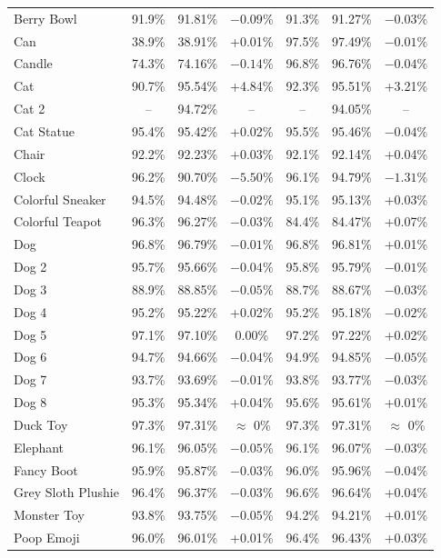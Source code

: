 \documentclass[journal,12pt,onecolumn,draftclsnofoot]{IEEEtran}
\begin{document}
\begin{longtable}{l c c c c c c}
Berry Bowl & 91.9\% & 91.81\% & $-0.09\%$ & 91.3\% & 91.27\% & $-0.03\%$ \\
Can & 38.9\% & 38.91\% & +0.01\% & 97.5\% & 97.49\% & $-0.01\%$ \\
Candle & 74.3\% & 74.16\% & $-0.14\%$ & 96.8\% & 96.76\% & $-0.04\%$ \\
Cat & 90.7\% & 95.54\% & +4.84\% & 92.3\% & 95.51\% & +3.21\% \\
Cat 2 & -- & 94.72\% & -- & -- & 94.05\% & -- \\
Cat Statue & 95.4\% & 95.42\% & +0.02\% & 95.5\% & 95.46\% & $-0.04\%$ \\
Chair & 92.2\% & 92.23\% & +0.03\% & 92.1\% & 92.14\% & +0.04\% \\
Clock & 96.2\% & 90.70\% & $-5.50\%$ & 96.1\% & 94.79\% & $-1.31\%$ \\
Colorful Sneaker & 94.5\% & 94.48\% & $-0.02\%$ & 95.1\% & 95.13\% & +0.03\% \\
Colorful Teapot & 96.3\% & 96.27\% & $-0.03\%$ & 84.4\% & 84.47\% & +0.07\% \\
Dog & 96.8\% & 96.79\% & $-0.01\%$ & 96.8\% & 96.81\% & +0.01\% \\
Dog 2 & 95.7\% & 95.66\% & $-0.04\%$ & 95.8\% & 95.79\% & $-0.01\%$ \\
Dog 3 & 88.9\% & 88.85\% & $-0.05\%$ & 88.7\% & 88.67\% & $-0.03\%$ \\
Dog 4 & 95.2\% & 95.22\% & +0.02\% & 95.2\% & 95.18\% & $-0.02\%$ \\
Dog 5 & 97.1\% & 97.10\% & 0.00\% & 97.2\% & 97.22\% & +0.02\% \\
Dog 6 & 94.7\% & 94.66\% & $-0.04\%$ & 94.9\% & 94.85\% & $-0.05\%$ \\
Dog 7 & 93.7\% & 93.69\% & $-0.01\%$ & 93.8\% & 93.77\% & $-0.03\%$ \\
Dog 8 & 95.3\% & 95.34\% & +0.04\% & 95.6\% & 95.61\% & +0.01\% \\
Duck Toy & 97.3\% & 97.31\% & $\approx$ 0\% & 97.3\% & 97.31\% & $\approx$ 0\% \\
Elephant & 96.1\% & 96.05\% & $-0.05\%$ & 96.1\% & 96.07\% & $-0.03\%$ \\
Fancy Boot & 95.9\% & 95.87\% & $-0.03\%$ & 96.0\% & 95.96\% & $-0.04\%$ \\
Grey Sloth Plushie & 96.4\% & 96.37\% & $-0.03\%$ & 96.6\% & 96.64\% & +0.04\% \\
Monster Toy & 93.8\% & 93.75\% & $-0.05\%$ & 94.2\% & 94.21\% & +0.01\% \\
Poop Emoji & 96.0\% & 96.01\% & +0.01\% & 96.4\% & 96.43\% & +0.03\% \\

\end{longtable}
\end{document}
